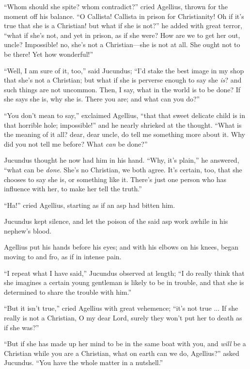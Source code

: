 ``Whom should she spite? whom contradict?'' cried Agellius,
thrown for the moment off his balance. ``O Callista! Callista in
prison for Christianity! Oh if it's true that she is a Christian! but
what if she is not?'' he added with great terror, ``what if
she's not, and yet in prison, as if she were? How are we to get
her out, uncle? Impossible! no, she's not a Christian—she is not at
all. She ought not to be there! Yet how wonderful!''

``Well, I am sure of it, too,'' said Jucundus; ``I'd
stake the best image in my shop that she's not a Christian; but what
if she is perverse enough to say she \emph{is}? and such things are
not uncommon. Then, I say, what in the world is to be done? If she
says she is, why she is. There you are; and what can you do?''

``You don't mean to say,'' exclaimed Agellius, ``that
that sweet delicate child is in that horrible hole; impossible!''
and he nearly shrieked at the thought. ``What is the meaning of it
all? dear, dear uncle, do tell me something more about it. Why did you
not tell me before? What \emph{can} be done?''

Jucundus thought he now had him in his hand. ``Why, it's
plain,'' he answered, ``what can be \emph{done}. She's no
Christian, we both agree. It's certain, too, that she chooses to say
she is, or something like it. There's just one person who has
influence with her, to make her tell the truth.''

``Ha!'' cried Agellius, starting as if an asp had bitten
him.

Jucundus kept silence, and let the poison of the said asp work
awhile in his nephew's blood.

Agellius put his hands before his eyes; and with his elbows on his
knees, began moving to and fro, as if in intense pain.

``I repeat what I have said,'' Jucundus observed at length;
``I do really think that she imagines a certain young gentleman is
likely to be in trouble, and that she is determined to share the
trouble with him.''

``But it isn't true,'' cried Agellius with great vehemence;
``it's not true ... If she really is not a Christian, O my dear
Lord, surely they won't put her to death as if she was?''

``But if she has made up her mind to be in the same boat with
you, and \emph{will} be a Christian while you are a Christian, what on
earth can we do, Agellius?'' asked Jucundus. ``You have the
whole matter in a nutshell.''

